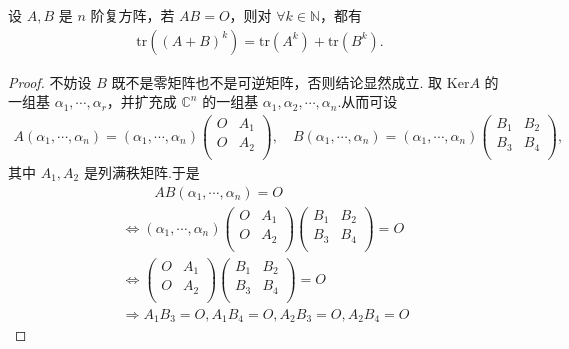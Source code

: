 \documentclass[../../main.tex]{subfiles}%
\begin{document}
\begin{example}
设 $A,B$ 是 $n$ 阶复方阵，若 $AB=O$，则对 $\forall k\in \mathbb{N}$，都有
\begin{align*}
\mathrm{tr}\left( \left( A+B \right) ^k \right) =\mathrm{tr}\left( A^k \right) +\mathrm{tr}\left( B^k \right) .
\end{align*}
\end{example}
\begin{proof}
不妨设 $B$ 既不是零矩阵也不是可逆矩阵，否则结论显然成立.
取 $\mathrm{Ker}A$ 的一组基 $\alpha _1,\cdots ,\alpha _r$，并扩充成 $\mathbb{C} ^n$ 的一组基 $\alpha _1,\alpha _2,\cdots ,\alpha _n$.从而可设
\begin{align*}
A\left( \alpha _1,\cdots ,\alpha _n \right) =\left( \alpha _1,\cdots ,\alpha _n \right) \begin{pmatrix}
O&		A_1\\
O&		A_2\\
\end{pmatrix}, \quad B\left( \alpha _1,\cdots ,\alpha _n \right) =\left( \alpha _1,\cdots ,\alpha _n \right) \begin{pmatrix}
B_1&		B_2\\
B_3&		B_4\\
\end{pmatrix},
\end{align*}
其中 $A_1,A_2$ 是列满秩矩阵.于是
\begin{align*}
&\quad \quad \,\, AB\left( \alpha _1,\cdots ,\alpha _n \right) =O\\
&\Longleftrightarrow \left( \alpha _1,\cdots ,\alpha _n \right) \begin{pmatrix}
O&		A_1\\
O&		A_2\\
\end{pmatrix} \begin{pmatrix}
B_1&		B_2\\
B_3&		B_4\\
\end{pmatrix} =O
\\
&\Longleftrightarrow \begin{pmatrix}
O&		A_1\\
O&		A_2\\
\end{pmatrix} \begin{pmatrix}
B_1&		B_2\\
B_3&		B_4\\
\end{pmatrix} =O
\\
&\Longrightarrow A_1B_3=O,A_1B_4=O,A_2B_3=O,A_2B_4=O

\end{align*}
\end{proof}
\end{document}
